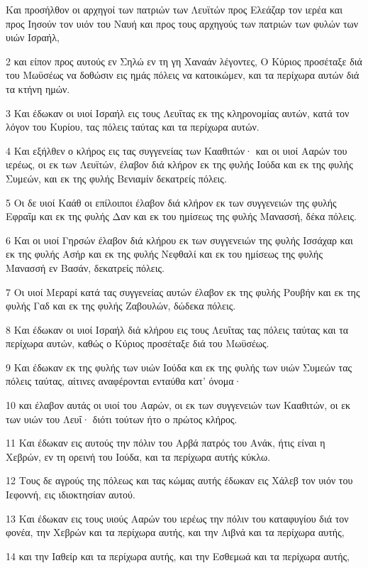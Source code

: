 \par Και προσήλθον οι αρχηγοί των πατριών των Λευϊτών προς Ελεάζαρ τον ιερέα και προς Ιησούν τον υιόν του Ναυή και προς τους αρχηγούς των πατριών των φυλών των υιών Ισραήλ,
\par 2 και είπον προς αυτούς εν Σηλώ εν τη γη Χαναάν λέγοντες, Ο Κύριος προσέταξε διά του Μωϋσέως να δοθώσιν εις ημάς πόλεις να κατοικώμεν, και τα περίχωρα αυτών διά τα κτήνη ημών.
\par 3 Και έδωκαν οι υιοί Ισραήλ εις τους Λευΐτας εκ της κληρονομίας αυτών, κατά τον λόγον του Κυρίου, τας πόλεις ταύτας και τα περίχωρα αυτών.
\par 4 Και εξήλθεν ο κλήρος εις τας συγγενείας των Κααθιτών· και οι υιοί Ααρών του ιερέως, οι εκ των Λευϊτών, έλαβον διά κλήρον εκ της φυλής Ιούδα και εκ της φυλής Συμεών, και εκ της φυλής Βενιαμίν δεκατρείς πόλεις.
\par 5 Οι δε υιοί Καάθ οι επίλοιποι έλαβον διά κλήρον εκ των συγγενειών της φυλής Εφραΐμ και εκ της φυλής Δαν και εκ του ημίσεως της φυλής Μανασσή, δέκα πόλεις.
\par 6 Και οι υιοί Γηρσών έλαβον διά κλήρου εκ των συγγενειών της φυλής Ισσάχαρ και εκ της φυλής Ασήρ και εκ της φυλής Νεφθαλί και εκ του ημίσεως της φυλής Μανασσή εν Βασάν, δεκατρείς πόλεις.
\par 7 Οι υιοί Μεραρί κατά τας συγγενείας αυτών έλαβον εκ της φυλής Ρουβήν και εκ της φυλής Γαδ και εκ της φυλής Ζαβουλών, δώδεκα πόλεις.
\par 8 Και έδωκαν οι υιοί Ισραήλ διά κλήρου εις τους Λευΐτας τας πόλεις ταύτας και τα περίχωρα αυτών, καθώς ο Κύριος προσέταξε διά του Μωϋσέως.
\par 9 Και έδωκαν εκ της φυλής των υιών Ιούδα και εκ της φυλής των υιών Συμεών τας πόλεις ταύτας, αίτινες αναφέρονται ενταύθα κατ' όνομα·
\par 10 και έλαβον αυτάς οι υιοί του Ααρών, οι εκ των συγγενειών των Κααθιτών, οι εκ των υιών του Λευΐ· διότι τούτων ήτο ο πρώτος κλήρος.
\par 11 Και έδωκαν εις αυτούς την πόλιν του Αρβά πατρός του Ανάκ, ήτις είναι η Χεβρών, εν τη ορεινή του Ιούδα, και τα περίχωρα αυτής κύκλω.
\par 12 Τους δε αγρούς της πόλεως και τας κώμας αυτής έδωκαν εις Χάλεβ τον υιόν του Ιεφοννή, εις ιδιοκτησίαν αυτού.
\par 13 Και έδωκαν εις τους υιούς Ααρών του ιερέως την πόλιν του καταφυγίου διά τον φονέα, την Χεβρών και τα περίχωρα αυτής, και την Λιβνά και τα περίχωρα αυτής,
\par 14 και την Ιαθείρ και τα περίχωρα αυτής, και την Εσθεμωά και τα περίχωρα αυτής,
